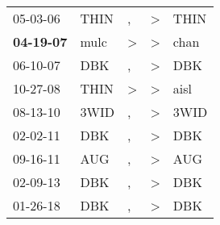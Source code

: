 \begin{supertabular}{p{0.07\textwidth}p{0.06\textwidth}p{0.02\textwidth}p{0.02\textwidth}p{0.06\textwidth}}
          05-03-06\textsuperscript{} &          THIN\textsuperscript{} &             , &     \textgreater &  THIN\textsuperscript{} \\
 \textbf{04-19-07\textsuperscript{}} &          mulc\textsuperscript{} &  \textgreater &     \textgreater &  chan\textsuperscript{} \\
          06-10-07\textsuperscript{} &           DBK\textsuperscript{} &             , &     \textgreater &   DBK\textsuperscript{} \\
          10-27-08\textsuperscript{} &          THIN\textsuperscript{} &  \textgreater &     \textgreater &  aisl\textsuperscript{} \\
          08-13-10\textsuperscript{} &          3WID\textsuperscript{} &             , &     \textgreater &  3WID\textsuperscript{} \\
          02-02-11\textsuperscript{} &           DBK\textsuperscript{} &             , &     \textgreater &   DBK\textsuperscript{} \\
          09-16-11\textsuperscript{} &           AUG\textsuperscript{} &             , &     \textgreater &   AUG\textsuperscript{} \\
          02-09-13\textsuperscript{} &           DBK\textsuperscript{} &             , &     \textgreater &   DBK\textsuperscript{} \\
          01-26-18\textsuperscript{} &           DBK\textsuperscript{} &             , &     \textgreater &   DBK\textsuperscript{} \\
\end{supertabular}
